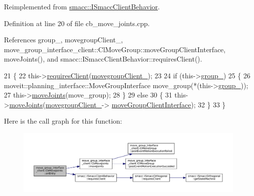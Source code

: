 Reimplemented from \hyperlink{classsmacc_1_1ISmaccClientBehavior_a3ec24a839087c550e1d62a81e48cf530}{smacc\+::\+I\+Smacc\+Client\+Behavior}.



Definition at line 20 of file cb\+\_\+move\+\_\+joints.\+cpp.



References group\+\_\+, movegroup\+Client\+\_\+, move\+\_\+group\+\_\+interface\+\_\+client\+::\+Cl\+Move\+Group\+::move\+Group\+Client\+Interface, move\+Joints(), and smacc\+::\+I\+Smacc\+Client\+Behavior\+::requires\+Client().


\begin{DoxyCode}
21   \{
22     this->\hyperlink{classsmacc_1_1ISmaccClientBehavior_a32b16e99e3b4cb289414203dc861a440}{requiresClient}(\hyperlink{classmove__group__interface__client_1_1CbMoveJoints_a9c1ffe89b25fc5693949241217d73e90}{movegroupClient\_});
23 
24     \textcolor{keywordflow}{if} (this->\hyperlink{classmove__group__interface__client_1_1CbMoveJoints_aed3fff5331aa947ec89c55945bae1afc}{group\_})
25     \{
26       moveit::planning\_interface::MoveGroupInterface move\_group(*(this->\hyperlink{classmove__group__interface__client_1_1CbMoveJoints_aed3fff5331aa947ec89c55945bae1afc}{group\_}));
27       this->\hyperlink{classmove__group__interface__client_1_1CbMoveJoints_aa60670293a8fafcb6e091b85af722822}{moveJoints}(move\_group);
28     \}
29     \textcolor{keywordflow}{else}
30     \{
31       this->\hyperlink{classmove__group__interface__client_1_1CbMoveJoints_aa60670293a8fafcb6e091b85af722822}{moveJoints}(\hyperlink{classmove__group__interface__client_1_1CbMoveJoints_a9c1ffe89b25fc5693949241217d73e90}{movegroupClient\_}->
      \hyperlink{classmove__group__interface__client_1_1ClMoveGroup_a5f0ea9b52695661b17605691168d1f31}{moveGroupClientInterface});
32     \}
33   \}
\end{DoxyCode}
Here is the call graph for this function\+:
\nopagebreak
\begin{figure}[H]
\begin{center}
\leavevmode
\includegraphics[width=350pt]{classmove__group__interface__client_1_1CbMoveJoints_af1e51367bb28be09704ab3747afff1f1_cgraph}
\end{center}
\end{figure}
\mbox{\label{classmove__group__interface__client_1_1CbMoveJoints_ac797c81d4a17c11e224553d9c231fe9f}} 
